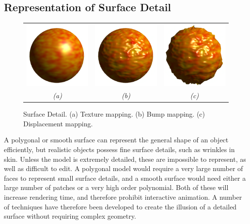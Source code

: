 \subsection{\label{sec:litreview:surfaces:detail}Representation of Surface Detail}
\begin{figure}
\begin{center}
\begin{tabular}{ccc}
\includegraphics[width=3.5cm]{../images/sphere_texmap} &
\includegraphics[width=3.5cm]{../images/sphere_bumpmap} &
\includegraphics[width=3.5cm]{../images/sphere_dispmap} \\
{\it (a)} & {\it (b)} & {\it (c)} \\
\end{tabular}
\caption[Surface Detail]{\label{fig:surfacedetail} Surface Detail. (a) Texture mapping. (b) Bump mapping. (c) Displacement mapping.}
\end{center}
\end{figure}
A polygonal or smooth surface can represent the general shape of an object efficiently, but realistic objects possess fine surface details, such as wrinkles in skin. Unless the model is extremely detailed, these are impossible to represent, as well as difficult to edit. A polygonal model would require a very large number of faces to represent small surface details, and a smooth surface would need either a large number of patches or a very high order polynomial. Both of these will increase rendering time, and therefore prohibit interactive animation. A number of techniques have therefore been developed to create the illusion of a detailed surface without requiring complex geometry.

